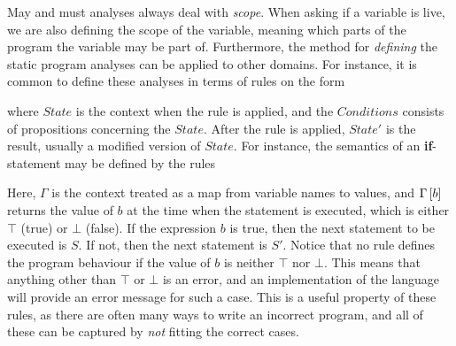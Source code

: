 May and must analyses always deal with \emph{scope}. When asking if a variable is live, we are also defining the scope of the variable, meaning which parts of the program the variable may be part of. Furthermore, the method for \emph{defining} the static program analyses can be applied to other domains. For instance, it is common to define these analyses in terms of rules on the form

\begin{prooftree}
\end{prooftree} 

where $State$ is the context when the rule is applied, and the $Conditions$ consists of propositions concerning the $State$. After the rule is applied, $State'$ is the result, usually a modified version of $State$. For instance, the semantics of an \textbf{if}-statement may be defined by the rules

\begin{minipage}{0.5\textwidth}
   \footnotesize
\begin{prooftree}
\end{prooftree}
\end{minipage}
\begin{minipage}{0.5\textwidth}
   \footnotesize
\begin{prooftree}
\end{prooftree}
\end{minipage}

Here, $\Gamma$ is the context treated as a map from variable names to values, and $\lookup{\Gamma}{b}$ returns the value of $b$ at the time when the statement is executed, which is either $\top$ (true) or $\bot$ (false). If the expression $b$ is true, then the next statement to be executed is $S$. If not, then the next statement is $S'$. Notice that no rule defines the program behaviour if the value of $b$ is neither $\top$ nor $\bot$. This means that anything other than $\top$ or $\bot$ is an error, and an implementation of the language will provide an error message for such a case. This is a useful property of these rules, as there are often many ways to write an incorrect program, and all of these can be captured by \emph{not} fitting the correct cases.

